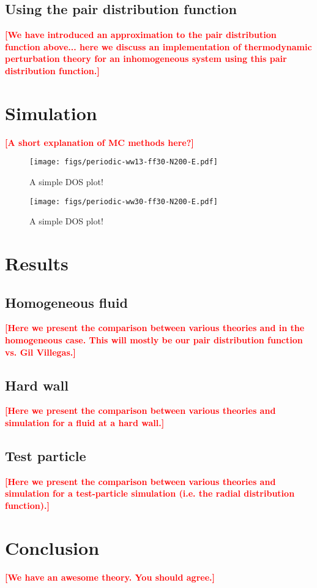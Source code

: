 \documentclass[letterpaper,twocolumn,amsmath,amssymb,pre,aps,10pt]{revtex4-1}
\newcommand\fixme[1]{\textcolor{red}{\textbf{[#1]}}}
\begin{document}
\subsection{Using the pair distribution function}


\fixme{We have introduced an approximation to the pair distribution
  function above... here we discuss an implementation of thermodynamic
  perturbation theory for an inhomogeneous system using this pair
  distribution function.}


\section{Simulation}

\fixme{A short explanation of MC methods here?}

\begin{figure}
  \texttt{[image: figs/periodic-ww13-ff30-N200-E.pdf]}
  \caption{A simple DOS plot!}
\end{figure}

\begin{figure}
  \texttt{[image: figs/periodic-ww30-ff30-N200-E.pdf]}
  \caption{A simple DOS plot!}
\end{figure}

\section{Results}

\subsection{Homogeneous fluid}

\fixme{Here we present the comparison between various theories and in
  the homogeneous case.  This will mostly be our pair distribution
  function vs. Gil Villegas.}

\subsection{Hard wall}

\fixme{Here we present the comparison between various theories and
  simulation for a fluid at a hard wall.}

\subsection{Test particle}

\fixme{Here we present the comparison between various theories and
  simulation for a test-particle simulation (i.e. the radial
  distribution function).}

\section{Conclusion}

\fixme{We have an awesome theory. You should agree.}

\end{document}

